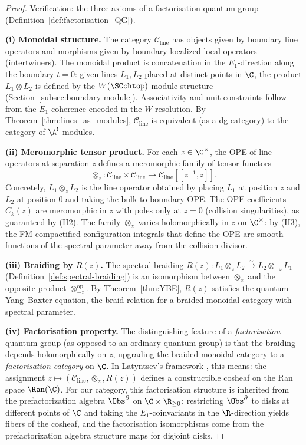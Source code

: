 \begin{proof}
Verification: the three axioms of a factorisation quantum group (Definition~\ref{def:factorisation_QG}).

\medskip
\noindent\textbf{(i) Monoidal structure.}
The category $\mathcal{C}_{\mathrm{line}}$ has objects given by boundary line operators and morphisms given by boundary-localized local operators (intertwiners). The monoidal product is concatenation in the $E_1$-direction along the boundary $t = 0$: given lines $L_1, L_2$ placed at distinct points in $\C$, the product $L_1 \otimes L_2$ is defined by the $W(\SCchtop)$-module structure (Section~\ref{subsec:boundary-module}). Associativity and unit constraints follow from the $E_1$-coherence encoded in the $W$-resolution. By Theorem~\ref{thm:lines_as_modules}, $\mathcal{C}_{\mathrm{line}}$ is equivalent (as a dg category) to the category of $\A^!$-modules.

\medskip
\noindent\textbf{(ii) Meromorphic tensor product.}
For each $z \in \C^\times$, the OPE of line operators at separation $z$ defines a meromorphic family of tensor functors
\[
\otimes_z \colon \mathcal{C}_{\mathrm{line}} \times \mathcal{C}_{\mathrm{line}} \longrightarrow \mathcal{C}_{\mathrm{line}}[[z^{-1}, z]].
\]
Concretely, $L_1 \otimes_z L_2$ is the line operator obtained by placing $L_1$ at position $z$ and $L_2$ at position $0$ and taking the bulk-to-boundary OPE. The OPE coefficients $C_k(z)$ are meromorphic in $z$ with poles only at $z = 0$ (collision singularities), as guaranteed by (H2). The family $\otimes_z$ varies holomorphically in $z$ on $\C^\times$: by (H3), the FM-compactified configuration integrals that define the OPE are smooth functions of the spectral parameter away from the collision divisor.

\medskip
\noindent\textbf{(iii) Braiding by $R(z)$.}
The spectral braiding $R(z) \colon L_1 \otimes_z L_2 \xrightarrow{\sim} L_2 \otimes_{-z} L_1$ (Definition~\ref{def:spectral-braiding}) is an isomorphism between $\otimes_z$ and the opposite product $\otimes_{-z}^{\mathrm{op}}$. By Theorem~\ref{thm:YBE}, $R(z)$ satisfies the quantum Yang--Baxter equation, the braid relation for a braided monoidal category with spectral parameter.

\medskip
\noindent\textbf{(iv) Factorisation property.}
The distinguishing feature of a \emph{factorisation} quantum group (as opposed to an ordinary quantum group) is that the braiding depends holomorphically on $z$, upgrading the braided monoidal category to a \emph{factorisation category} on $\C$. In Latyntsev's framework \cite{Lat23}, this means: the assignment $z \mapsto (\mathcal{C}_{\mathrm{line}}, \otimes_z, R(z))$ defines a constructible cosheaf on the Ran space $\Ran(\C)$. For our category, this factorisation structure is inherited from the prefactorization algebra $\Obs^{\partial}$ on $\C \times \R_{\geq 0}$: restricting $\Obs^{\partial}$ to disks at different points of $\C$ and taking the $E_1$-coinvariants in the $\R$-direction yields fibers of the cosheaf, and the factorisation isomorphisms come from the prefactorization algebra structure maps for disjoint disks.


\end{proof}
